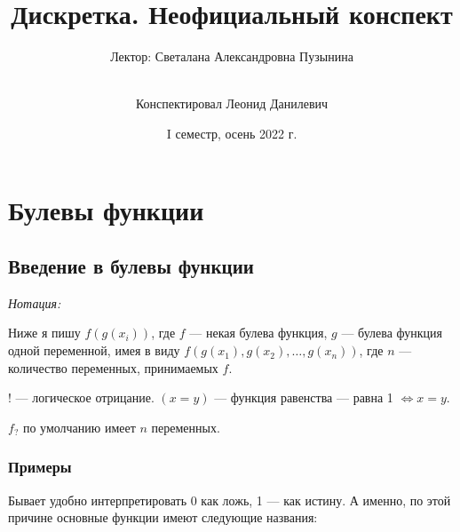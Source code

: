 \documentclass[a4paper]{report}
\date{I семестр, осень 2022 г.}
\title{Дискретка. Неофициальный конспект}
\author{Лектор: Светалана Александровна Пузынина \and \\ Конспектировал Леонид Данилевич}
\begin{document}
    \maketitle
    \tableofcontents
    \newpage
    \setcounter{lection}{0}


    \chapter{Булевы функции}


    \section{Введение в булевы функции}

    \emph{Нотация:}

    Ниже я пишу $f(g(x_i))$, где $f$ --- некая булева функция, $g$ --- булева функция одной переменной, имея в виду $f(g(x_1), g(x_2), \dots, g(x_n))$, где $n$ --- количество переменных, принимаемых $f$.

    $!$ --- логическое отрицание. $(x = y)$ --- функция равенства --- равна 1 $\iff x = y$.

    $f_?$ по умолчанию имеет $n$ переменных.
    \ok

    \subsection{Примеры}
    Бывает удобно интерпретировать 0 как ложь, 1 --- как истину.
    А именно, по этой причине основные функции имеют следующие названия:
\end{document}
